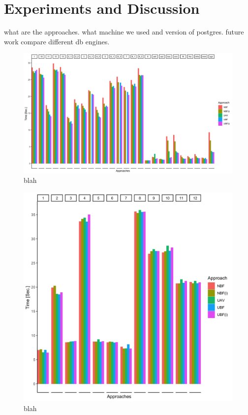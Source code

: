 \section{Experiments and Discussion}
\label{sec:exp}

what are the approaches.
what machine we used and version of postgres. 
future work compare different db engines. 


\begin{figure}
\includegraphics[width = \linewidth] {figs/plots/enron1-5.png}
\caption[blah]{blah}
\label{fig:enron1-5}
\end{figure}

\begin{figure}
\centering
\includegraphics[scale=0.12] {figs/plots/emp1-5.png}
\caption[blah]{blah}
\label{fig:emp1-5}
\end{figure}


